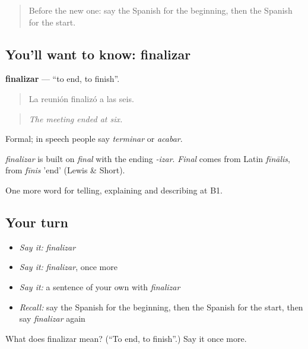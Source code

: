 \label{lesson:ES-C542-finalizar}



\begin{quote}
Before the new one: say the Spanish for the beginning, then the Spanish for the start.
\end{quote}

\subsection*{You'll want to know: finalizar}
\textbf{finalizar} — \textquotedblleft{}to end, to finish\textquotedblright{}.

\begin{quote}
La reunión finalizó a las seis.
\end{quote}

\begin{quote}
\emph{The meeting ended at six.}
\end{quote}

Formal; in speech people say \emph{terminar} or \emph{acabar}.

\begin{cousinweb}
\emph{finalizar} is built on \emph{final} with the ending \emph{-izar}. \emph{Final} comes from Latin \emph{fīnālis}, from \emph{fīnis} 'end' (Lewis \& Short).
\end{cousinweb}

\begin{grammarlens}[title={What you've built}]
One more word for telling, explaining and describing at B1.
\end{grammarlens}

\subsection*{Your turn}
\begin{itemize}
\raggedright
  \item \emph{Say it:} \emph{finalizar}
  \item \emph{Say it:} \emph{finalizar}, once more
  \item \emph{Say it:} a sentence of your own with \emph{finalizar}
  \item \emph{Recall:} say the Spanish for the beginning, then the Spanish for the start, then say \emph{finalizar} again
\end{itemize}

\begin{tcolorbox}[breakable,colback=teal!4,colframe=teal!35!black,title={Before you move on}]
What does finalizar mean? (\textquotedblleft{}To end, to finish\textquotedblright{}.) Say it once more.
\end{tcolorbox}
